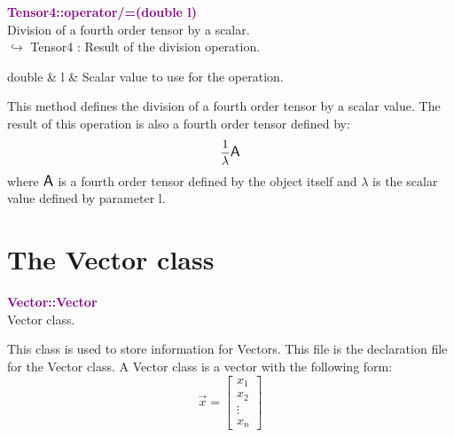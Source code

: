 \textcolor{purple}{\textbf{Tensor4::operator/=(double l)}}\label{Tensor4::operator/=(double l)}\\
Division of a fourth order tensor by a scalar.\\ \hspace*{10mm}$\hookrightarrow$ Tensor4 : Result of the division operation.

\begin{tcolorbox}[width=\textwidth,myArgs,tabularx={ll|R}]
double & l & Scalar value to use for the operation.
\end{tcolorbox}

This method defines the division of a fourth order tensor by a scalar value.
The result of this operation is also a fourth order tensor defined by:
\begin{equation*}
\frac{1}{\lambda} \mbox{\large\ensuremath{\mathsf{A}}}
\end{equation*}
where $\mbox{\large\ensuremath{\mathsf{A}}}$ is a fourth order tensor defined by the object itself and $\lambda$ is the scalar value defined by parameter l.

\section{The Vector class}

\textcolor{purple}{\textbf{Vector::Vector}}\label{Vector::Vector}\\
Vector class.

This class is used to store information for Vectors.
This file is the declaration file for the Vector class. A Vector class is a vector with the following form:
\begin{equation*}
\overrightarrow{x}=\left[\begin{array}{c}
  x_{1}\\
  x_{2}\\
  \vdots\\
  x_{n}
  \end{array}\right]
\end{equation*}



